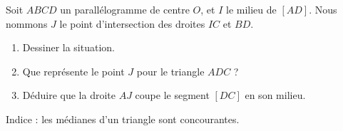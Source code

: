 
\begin{exercice}\label{exoSeconde-0045}

    Soit \( ABCD\) un parallélogramme de centre \( O\), et \( I\) le milieu de \( [AD]\). Nous nommons \( J\) le point d'intersection des droites \( IC\) et \( BD\).
    \begin{enumerate}
        \item
            Dessiner la situation.
        \item
            Que représente le point \( J\) pour le triangle \( ADC\) ? 
        \item
            Déduire que la droite \( AJ\) coupe le segment \( [DC]\) en son milieu.
    \end{enumerate}
    Indice : les médianes d'un triangle sont concourantes.

\end{exercice}
